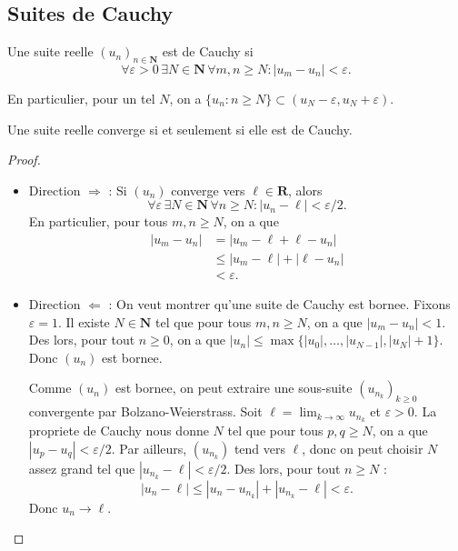 \subsection*{Suites de Cauchy}
\begin{definition}
Une suite reelle $(u_{n})_{n\in \mathbf{N}}$ est de Cauchy si
$$
\forall\varepsilon>0\,\exists N\in \mathbf{N}\,\forall m,n\ge N: |u_{m}-u_{n}|<\varepsilon.
$$

En particulier, pour un tel $N$, on a $\{ u_{n}:n\ge N \}\subset(u_{N}-\varepsilon,u_{N}+\varepsilon)$.
\end{definition}
\begin{theorem}
Une suite reelle converge si et seulement si elle est de Cauchy.
\end{theorem}
\begin{proof}
\begin{itemize}
\item Direction $\Rightarrow$ : Si $(u_{n})$ converge vers $\ell \in \mathbf{R}$, alors
$$
\forall\varepsilon\,\exists N\in \mathbf{N}\,\forall n\ge N:|u_{n}-\ell |<\varepsilon /2.
$$
En particulier, pour tous $m,n\ge N$, on a que 
\begin{align*}
|u_{m}-u_{n}| & = |u_{m}-\ell +\ell -u_{n} | \\
 & \le |u_{m}-\ell|+|\ell -u_{n}| \\
 & < \varepsilon.
\end{align*}
\item Direction $\Leftarrow$ : On veut montrer qu'une suite de Cauchy est bornee. Fixons $\varepsilon=1$. Il existe $N\in \mathbf{N}$ tel que pour tous $m,n\ge N$, on a que $|u_{m}-u_{n}|<1$. Des lors, pour tout $n\ge 0$, on a que $|u_{n}|\le \max \{ |u_{0}|,\dots,|u_{N-1}|,|u_{N}|+1 \}$. Donc $(u_{n})$ est bornee.

Comme $(u_{n})$ est bornee, on peut extraire une sous-suite $(u_{n_{k}})_{k\ge 0}$ convergente par Bolzano-Weierstrass. Soit $\ell=\lim_{ k \to \infty }u_{n_{k}}$ et $\varepsilon>0$. La propriete de Cauchy nous donne $N$ tel que pour tous $p,q\ge N$, on a que $|u_{p}-u_{q}|<\varepsilon /2$. Par ailleurs, $(u_{n_{k}})$ tend vers $\ell$, donc on peut choisir $N$ assez grand tel que $|u_{n_{k}}-\ell|<\varepsilon /2$. Des lors, pour tout $n\ge N$ :
$$
|u_{n}-\ell|\le |u_{n}-u_{n_{k}}| +|u_{n_{k}}-\ell|<\varepsilon.
$$
Donc $u_{n}\to \ell$.
\end{itemize}
\end{proof}

